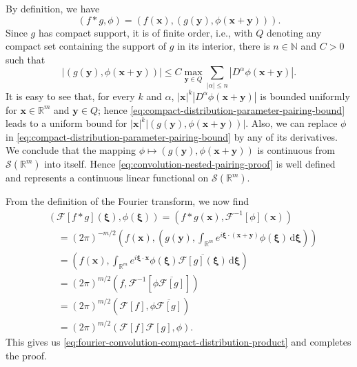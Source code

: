 \begin{Proof}
By definition, we have
\begin{equation}\label{eq:convolution-nested-pairing-proof}
(f*g,\phi)=(f(\bm{x}),(g(\bm{y}),\phi(\bm{x}+\bm{y}))).
\end{equation}
Since $g$ has compact support, it is of finite order, i.e., with $Q$ denoting any compact set containing the support of $g$ in its interior, there is $n\in\mathbb{N}$ and $C>0$ such that
\begin{equation}\label{eq:compact-distribution-parameter-pairing-bound}
|(g(\bm{y}),\phi(\bm{x}+\bm{y}))|\leq C\max_{\bm{y}\in Q}\sum_{|\alpha|\leq n}|D^\alpha\phi(\bm{x}+\bm{y})|.
\end{equation}
It is easy to see that, for every $k$ and $\alpha$, $|\bm{x}|^k|D^\alpha\phi(\bm{x}+\bm{y})|$ is bounded uniformly for $\bm{x}\in\mathbb{R}^m$ and $\bm{y}\in Q$; hence \eqref{eq:compact-distribution-parameter-pairing-bound} leads to a uniform bound for $|\bm{x}|^k|(g(\bm{y}),\phi(\bm{x}+\bm{y}))|$. Also, we can replace $\phi$ in \eqref{eq:compact-distribution-parameter-pairing-bound} by any of its derivatives. We conclude that the mapping $\phi\mapsto(g(\bm{y}),\phi(\bm{x}+\bm{y}))$ is continuous from $\mathcal{S}(\mathbb{R}^m)$ into itself. Hence \eqref{eq:convolution-nested-pairing-proof} is well defined and represents a continuous linear functional on $\mathcal{S}(\mathbb{R}^m)$.

From the definition of the Fourier transform, we now find
\begin{equation}\label{eq:fourier-convolution-compact-distribution-proof}
\begin{aligned}
&(\mathcal{F}[f*g](\bm{\xi}),\phi(\bm{\xi}))=(f*g(\bm{x}),\mathcal{F}^{-1}[\phi](\bm{x}))\\
&\quad=(2\pi)^{-m/2}\left(f(\bm{x}),\left(g(\bm{y}),\int_{\mathbb{R}^m}e^{i\bm{\xi}\cdot(\bm{x}+\bm{y})}\phi(\bm{\xi})\,\mathrm{d}\bm{\xi}\right)\right)\\
&\quad=\left(f(\bm{x}),\int_{\mathbb{R}^m}e^{i\bm{\xi}\cdot\bm{x}}\phi(\bm{\xi})\overline{\mathcal{F}[g](\bm{\xi})}\,\mathrm{d}\bm{\xi}\right)\\
&\quad=(2\pi)^{m/2}(f,\mathcal{F}^{-1}[\phi\overline{\mathcal{F}[g]}])\\
&\quad=(2\pi)^{m/2}(\mathcal{F}[f],\phi\overline{\mathcal{F}[g]})\\
&\quad=(2\pi)^{m/2}(\mathcal{F}[f]\mathcal{F}[g],\phi).
\end{aligned}
\end{equation}
This gives us \eqref{eq:fourier-convolution-compact-distribution-product} and completes the proof.
\end{Proof}
